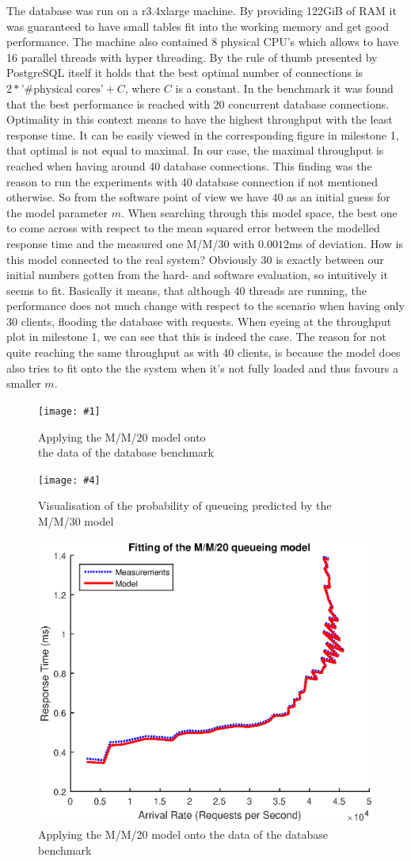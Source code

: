 \documentclass[11pt]{article}
\newcommand\TwoFig[6]{%
	\sbox\IBoxA{\texttt{[image: \#1]}}
	\sbox\IBoxB{\texttt{[image: \#4]}}%
	\ifdim\ht\IBoxA>\ht\IBoxB
	\setlength\IHeight{\ht\IBoxB}\else\setlength\IHeight{\ht\IBoxA}\fi%
	\begin{figure}[!htb]
		\minipage[t]{0.5\textwidth}\centering
		\texttt{[image: \#1]}
		\caption{#2}\label{#3}
		\endminipage \hfill
		\minipage[t]{0.5\textwidth}\centering
		\texttt{[image: \#4]}
		\caption{#5}\label{#6}
		\endminipage
	\end{figure}%
}
\begin{document}
The database was run on a r3.4xlarge machine. By providing 122GiB of RAM it was guaranteed to have small tables fit into the working memory and get good performance. The machine also contained 8 physical CPU's which allows to have 16 parallel threads with hyper threading. By the rule of thumb presented by PostgreSQL itself it holds that the best optimal number of connections is $2*\text{'\#physical cores'}+C$, where $C$ is a constant. In the benchmark it was found that the best performance is reached with 20 concurrent database connections. Optimality in this context means to have the highest throughput with the least response time. It can be easily viewed in the corresponding figure in milestone 1, that optimal is not equal to maximal. In our case, the maximal throughput is reached when having around 40 database connections. This finding was the reason to run the experiments with 40 database connection if not mentioned otherwise. So from the software point of view we have 40 as an initial guess for the model parameter $m$. When searching through this model space, the best one to come across with respect to the mean squared error between the modelled response time and the measured one M/M/30 with $0.0012$ms of deviation. How is this model connected to the real system? Obviously 30 is exactly between our initial numbers gotten from the hard- and software evaluation, so intuitively it seems to fit. Basically it means, that although 40 threads are running, the performance does not much change with respect to the scenario when having only 30 clients, flooding the database with requests. When eyeing at the throughput plot in milestone 1, we can see that this is indeed the case. The reason for not quite reaching the same throughput as with 40 clients, is because the model does also tries to fit onto the the system when it's not fully loaded and thus favours a smaller $m$. 

\TwoFig {figures/database/mm20} {Applying the M/M/20 model onto\\ the data of the database benchmark} {fig:mm40}
		{figures/database/qprob} {Visualisation of the probability of queueing predicted by the M/M/30 model} {fig:qprob}

\begin{figure}
\centering
\includegraphics[width=0.7\linewidth]{figures/database/mm20}
\caption{Applying the M/M/20 model onto the data of the database benchmark}
\label{fig:mm40}
\end{figure}
\end{document}

